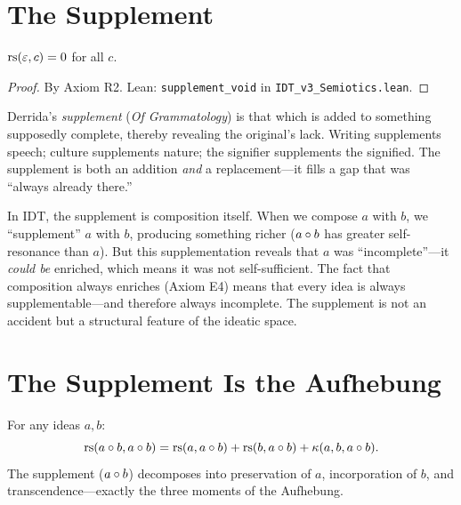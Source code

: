\section{The Supplement}

\begin{theorem}
\label{thm:supplement-void}
$\mathrm{rs}(\varepsilon, c) = 0$ for all $c$.
\end{theorem}

\begin{proof}
By Axiom R2.
Lean: \texttt{supplement\_void} in \texttt{IDT\_v3\_Semiotics.lean}.
\end{proof}

\begin{interpretation}
\label{interp:supplement}
Derrida's \emph{supplement} (\textit{Of Grammatology}) is that which is added
to something supposedly complete, thereby revealing the original's lack. Writing
supplements speech; culture supplements nature; the signifier supplements the
signified. The supplement is both an addition \emph{and} a replacement---it
fills a gap that was ``always already there.''

In IDT, the supplement is composition itself. When we compose $a$ with $b$, we
``supplement'' $a$ with $b$, producing something richer ($a \circ b$ has
greater self-resonance than $a$). But this supplementation reveals that $a$ was
``incomplete''---it \emph{could be} enriched, which means it was not
self-sufficient. The fact that composition always enriches (Axiom E4) means
that every idea is always supplementable---and therefore always incomplete.
The supplement is not an accident but a structural feature of the ideatic space.
\end{interpretation}

\section{The Supplement Is the Aufhebung}

\begin{theorem}
\label{thm:supplement-aufhebung}
For any ideas $a, b$:
\[
\mathrm{rs}(a \circ b, a \circ b) = \mathrm{rs}(a, a \circ b) + \mathrm{rs}(b, a \circ b) + \kappa(a, b, a \circ b).
\]
The supplement ($a \circ b$) decomposes into preservation of $a$,
incorporation of $b$, and transcendence---exactly the three moments of the
Aufhebung.
\end{theorem}

